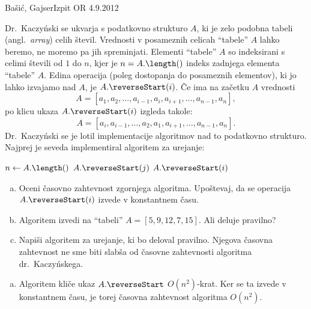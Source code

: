 \begin{naloga}{Bašić, Gajser}{Izpit OR 4.9.2012}
\begin{vprasanje}
Dr.~Kaczyński se ukvarja s podatkovno strukturo $A$,
ki je zelo podobna tabeli (angl.~{\em array}) celih števil.
Vrednosti v posameznih celicah ``tabele'' $A$ lahko beremo,
ne moremo pa jih spreminjati.
Elementi ``tabele'' $A$ so indeksirani s celimi števili od $1$ do $n$,
kjer je $n = A.\length()$ indeks zadnjega elementa ``tabele'' $A$.
Edina operacija (poleg dostopanja do posameznih elementov),
ki jo lahko izvajamo nad $A$, je $A.\reverseStart(i)$.
Če ima na začetku $A$ vrednosti
$$
A = [a_1, a_2, \dots, a_{i-1}, a_i, a_{i+1}, \dots, a_{n-1}, a_n],
$$
po klicu ukaza $A.\reverseStart(i)$ izgleda takole:
$$
A = [a_i, a_{i-1}, \dots, a_2, a_1, a_{i+1}, \dots, a_{n-1}, a_n] .
$$
Dr.~Kaczyński se je lotil implementacije algoritmov
nad to podatkovno strukturo.
Najprej je seveda implementiral algoritem za urejanje:
\begin{small}
\begin{algorithmic}
\State $n \gets A.\length()$
            \State $A.\reverseStart(j)$
            \State $A.\reverseStart(i)$
        \EndIf
    \EndFor
\EndFor
\end{algorithmic}
\end{small}

\begin{enumerate}[(a)]
\item Oceni časovno zahtevnost zgornjega algoritma.
Upoštevaj, da se operacija $A.\reverseStart(i)$ izvede v konstantnem času.

\item Algoritem izvedi na ``tabeli'' $A = [5, 9, 12, 7, 15]$.
Ali deluje pravilno?

\item Napiši algoritem za urejanje, ki bo deloval pravilno.
Njegova časovna zahtevnost ne sme biti slabša
od časovne zahtevnosti algoritma dr.~Kaczyńskega.
\end{enumerate}
\end{vprasanje}

\begin{odgovor}
\begin{enumerate}[(a)]
\item Algoritem kliče ukaz $A.\reverseStart$ $O(n^2)$-krat.
Ker se ta izvede v kon\-stant\-nem času,
je torej časovna zahtevnost algoritma $O(n^2)$.


\end{enumerate}
\end{odgovor}
\end{naloga}
